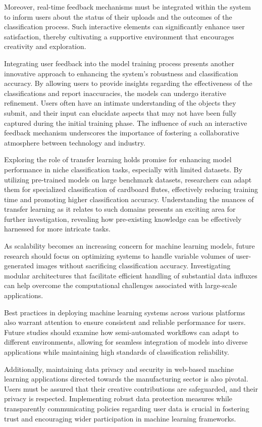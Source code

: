 Moreover, real-time feedback mechanisms must be integrated within the system to inform users about the status of their uploads and the outcomes of the classification process. Such interactive elements can significantly enhance user satisfaction, thereby cultivating a supportive environment that encourages creativity and exploration.

Integrating user feedback into the model training process presents another innovative approach to enhancing the system's robustness and classification accuracy. By allowing users to provide insights regarding the effectiveness of the classifications and report inaccuracies, the models can undergo iterative refinement. Users often have an intimate understanding of the objects they submit, and their input can elucidate aspects that may not have been fully captured during the initial training phase. The influence of such an interactive feedback mechanism underscores the importance of fostering a collaborative atmosphere between technology and industry.

Exploring the role of transfer learning holds promise for enhancing model performance in niche classification tasks, especially with limited datasets. By utilizing pre-trained models on large benchmark datasets, researchers can adapt them for specialized classification of cardboard flutes, effectively reducing training time and promoting higher classification accuracy. Understanding the nuances of transfer learning as it relates to such domains presents an exciting area for further investigation, revealing how pre-existing knowledge can be effectively harnessed for more intricate tasks.

As scalability becomes an increasing concern for machine learning models, future research should focus on optimizing systems to handle variable volumes of user-generated images without sacrificing classification accuracy. Investigating modular architectures that facilitate efficient handling of substantial data influxes can help overcome the computational challenges associated with large-scale applications.

Best practices in deploying machine learning systems across various platforms also warrant attention to ensure consistent and reliable performance for users. Future studies should examine how semi-automated workflows can adapt to different environments, allowing for seamless integration of models into diverse applications while maintaining high standards of classification reliability.

Additionally, maintaining data privacy and security in web-based machine learning applications directed towards the manufacturing sector is also pivotal. Users must be assured that their creative contributions are safeguarded, and their privacy is respected. Implementing robust data protection measures while transparently communicating policies regarding user data is crucial in fostering trust and encouraging wider participation in machine learning frameworks.

